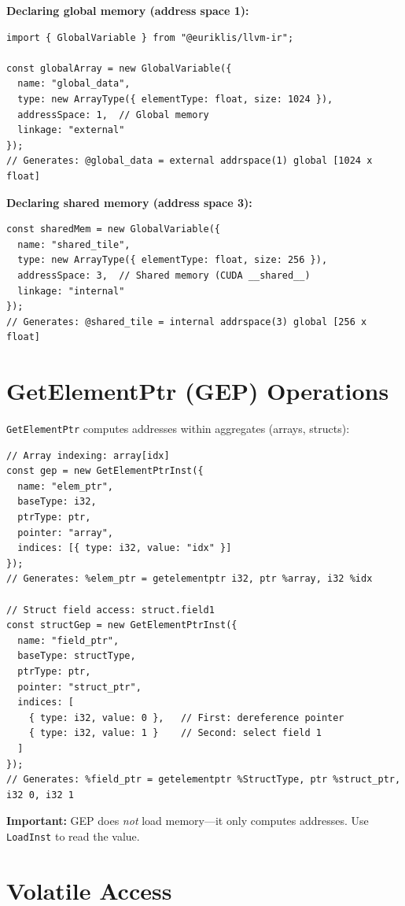 \documentclass[11pt,oneside]{book}
\begin{document}
\textbf{Declaring global memory (address space 1):}
\begin{lstlisting}[style=ts]
import { GlobalVariable } from "@euriklis/llvm-ir";

const globalArray = new GlobalVariable({
  name: "global_data",
  type: new ArrayType({ elementType: float, size: 1024 }),
  addressSpace: 1,  // Global memory
  linkage: "external"
});
// Generates: @global_data = external addrspace(1) global [1024 x float]
\end{lstlisting}

\textbf{Declaring shared memory (address space 3):}
\begin{lstlisting}[style=ts]
const sharedMem = new GlobalVariable({
  name: "shared_tile",
  type: new ArrayType({ elementType: float, size: 256 }),
  addressSpace: 3,  // Shared memory (CUDA __shared__)
  linkage: "internal"
});
// Generates: @shared_tile = internal addrspace(3) global [256 x float]
\end{lstlisting}

\section{GetElementPtr (GEP) Operations}

\texttt{GetElementPtr} computes addresses within aggregates (arrays, structs):

\begin{lstlisting}[style=ts]
// Array indexing: array[idx]
const gep = new GetElementPtrInst({
  name: "elem_ptr",
  baseType: i32,
  ptrType: ptr,
  pointer: "array",
  indices: [{ type: i32, value: "idx" }]
});
// Generates: %elem_ptr = getelementptr i32, ptr %array, i32 %idx

// Struct field access: struct.field1
const structGep = new GetElementPtrInst({
  name: "field_ptr",
  baseType: structType,
  ptrType: ptr,
  pointer: "struct_ptr",
  indices: [
    { type: i32, value: 0 },   // First: dereference pointer
    { type: i32, value: 1 }    // Second: select field 1
  ]
});
// Generates: %field_ptr = getelementptr %StructType, ptr %struct_ptr, i32 0, i32 1
\end{lstlisting}

\textbf{Important:} GEP does \emph{not} load memory—it only computes addresses. Use \texttt{LoadInst} to read the value.

\section{Volatile Access}
\end{document}
